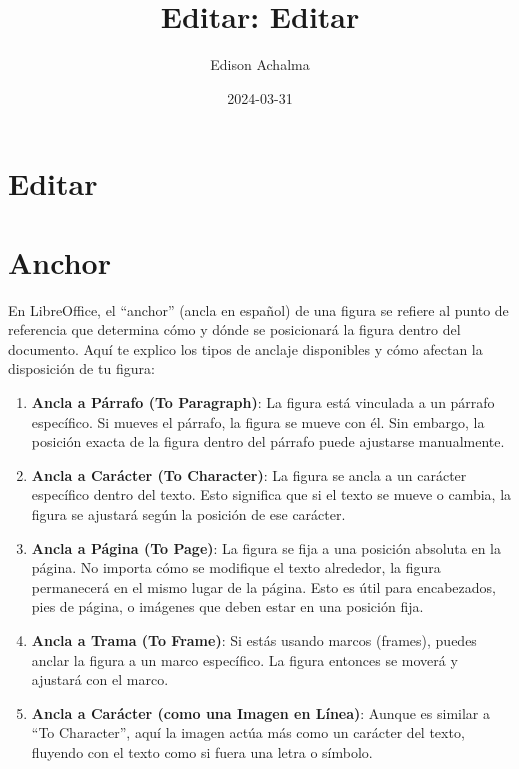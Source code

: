 \documentclass[
  jou,
  floatsintext,
  longtable,
  a4paper,
  nolmodern,
  notxfonts,
  notimes,
  colorlinks=true,linkcolor=blue,citecolor=blue,urlcolor=blue]{apa7}
\title{Editar: Editar}
\author{Edison Achalma}
\affiliation{
{Escuela Profesional de Economía, Universidad Nacional de San Cristóbal
de Huamanga}}
\date{2024-03-31}
\begin{document}
\maketitle

\hypertarget{toc}{}
\tableofcontents
\newpage
\section[Introduction]{Editar}

\setcounter{secnumdepth}{-\maxdimen} %

\setlength\LTleft{0pt}


\section{Anchor}\label{anchor}

En LibreOffice, el ``anchor'' (ancla en español) de una figura se
refiere al punto de referencia que determina cómo y dónde se posicionará
la figura dentro del documento. Aquí te explico los tipos de anclaje
disponibles y cómo afectan la disposición de tu figura:

\begin{enumerate}
\def\labelenumi{\arabic{enumi}.}
\item
  \textbf{Ancla a Párrafo (To Paragraph)}: La figura está vinculada a un
  párrafo específico. Si mueves el párrafo, la figura se mueve con él.
  Sin embargo, la posición exacta de la figura dentro del párrafo puede
  ajustarse manualmente.
\item
  \textbf{Ancla a Carácter (To Character)}: La figura se ancla a un
  carácter específico dentro del texto. Esto significa que si el texto
  se mueve o cambia, la figura se ajustará según la posición de ese
  carácter.
\item
  \textbf{Ancla a Página (To Page)}: La figura se fija a una posición
  absoluta en la página. No importa cómo se modifique el texto
  alrededor, la figura permanecerá en el mismo lugar de la página. Esto
  es útil para encabezados, pies de página, o imágenes que deben estar
  en una posición fija.
\item
  \textbf{Ancla a Trama (To Frame)}: Si estás usando marcos (frames),
  puedes anclar la figura a un marco específico. La figura entonces se
  moverá y ajustará con el marco.
\item
  \textbf{Ancla a Carácter (como una Imagen en Línea)}: Aunque es
  similar a ``To Character'', aquí la imagen actúa más como un carácter
  del texto, fluyendo con el texto como si fuera una letra o símbolo.
\end{enumerate}
\end{document}
